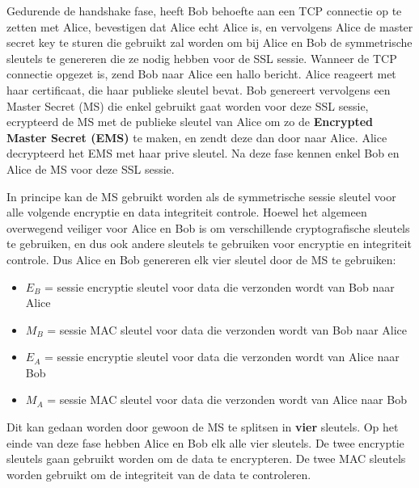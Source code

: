 Gedurende de handshake fase, heeft Bob behoefte aan een TCP connectie op te zetten met Alice, bevestigen dat Alice echt Alice is, en vervolgens Alice de master secret key te sturen die gebruikt zal worden om bij Alice en Bob de symmetrische sleutels te genereren die ze nodig hebben voor de SSL sessie.
Wanneer de TCP connectie opgezet is, zend Bob naar Alice een hallo bericht. Alice reageert met haar certificaat, die haar publieke sleutel bevat. Bob genereert vervolgens een Master Secret (MS) die enkel gebruikt gaat worden voor deze SSL sessie, ecrypteerd de MS met de publieke sleutel van Alice om zo de \textbf{Encrypted Master Secret (EMS)} te maken, en zendt deze dan door naar Alice. Alice decrypteerd het EMS met haar prive sleutel. Na deze fase kennen enkel Bob en Alice de MS voor deze SSL sessie.

\clearpage


In principe kan de MS gebruikt worden als de symmetrische sessie sleutel voor alle volgende encryptie en data integriteit controle. Hoewel het algemeen overwegend veiliger voor Alice en Bob is om verschillende cryptografische sleutels te gebruiken, en dus ook andere sleutels te gebruiken voor encryptie en integriteit controle. Dus Alice en Bob genereren elk vier sleutel door de MS te gebruiken:
\begin{itemize}
\item $E_B$ = sessie encryptie sleutel voor data die verzonden wordt van Bob naar Alice
\item $M_B$ = sessie MAC sleutel voor data die verzonden wordt van Bob naar Alice
\item $E_A$ = sessie encryptie sleutel voor data die verzonden wordt van Alice naar Bob
\item $M_A$ = sessie MAC sleutel voor data die verzonden wordt van Alice naar Bob
\end{itemize}
Dit kan gedaan worden door gewoon de MS te splitsen in \textbf{vier} sleutels. Op het einde van deze fase hebben Alice en Bob elk alle vier sleutels. De twee encryptie sleutels gaan gebruikt worden om de data te encrypteren. De twee MAC sleutels worden gebruikt om de integriteit van de data te controleren.


